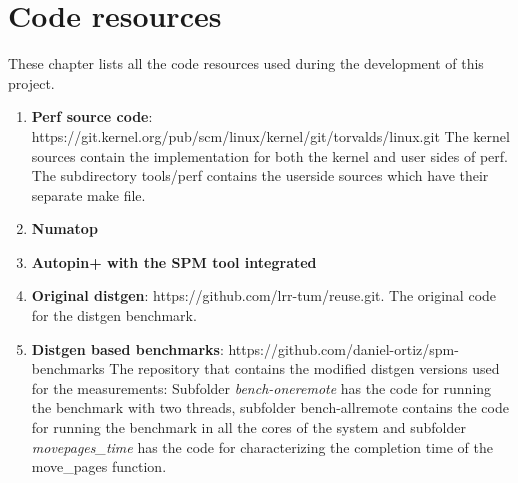 \chapter{Code resources}\label{app:coderes}

These chapter lists all the code resources used during the development of this project.

\begin{enumerate}
	\item \textbf{Perf source code}: https://git.kernel.org/pub/scm/linux/kernel/git/torvalds/linux.git The kernel sources contain the implementation for both the kernel and user sides of perf. The subdirectory tools/perf contains the userside sources which have their separate make file.
	\item \textbf{Numatop}
	\item \textbf{Autopin+ with the SPM tool integrated}
	\item \textbf{Original distgen}: https://github.com/lrr-tum/reuse.git. The original code for the distgen benchmark.
	\item \textbf{Distgen based benchmarks}: https://github.com/daniel-ortiz/spm-benchmarks The repository that contains the modified distgen versions used for the measurements: Subfolder \textit{bench-oneremote} has the code for running the benchmark with two threads, subfolder {bench-allremote} contains the code for running the benchmark in all the cores of the system and subfolder \textit{movepages\_time} has the code for characterizing the completion time of the move\_pages function.
\end{enumerate}

